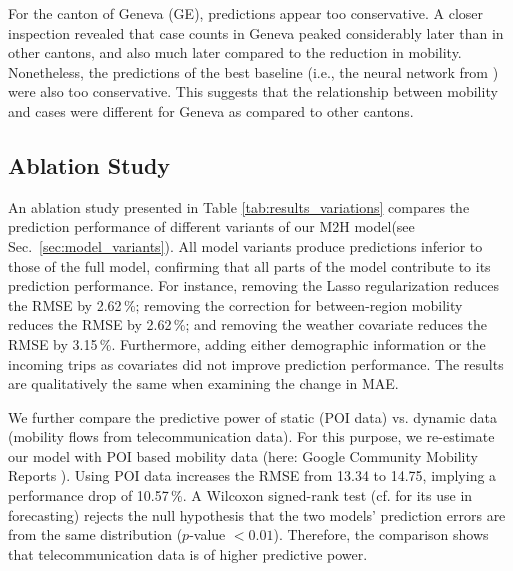 \documentclass[sigconf, review = false, nonacm = true]{acmart}
\newcommand\model{M2H model\xspace}
\begin{document}
For the canton of Geneva (GE), predictions appear too conservative. A closer inspection revealed that case counts in Geneva peaked considerably later than in other cantons, and also much later compared to the reduction in mobility. Nonetheless, the predictions of the best baseline (i.e., the neural network from \cite{wieczorek_neural_2020}) were also too conservative. This suggests that the relationship between mobility and cases were different for Geneva as compared to other cantons. 


\subsection{Ablation Study}
\label{sec:ablationStudy}

An ablation study presented in Table \ref{tab:results_variations} compares the prediction performance of different variants of our  \model (see Sec.~\ref{sec:model_variants}). All model variants produce predictions inferior to those of the full model, confirming that all parts of the model contribute to its prediction performance. For instance, removing the Lasso regularization reduces the RMSE by 2.62\,\%; removing the correction for between-region mobility reduces the RMSE by 2.62\,\%; and removing the weather covariate reduces the RMSE by 3.15\,\%. Furthermore, adding either demographic information or the incoming trips as covariates did not improve prediction performance. The results are qualitatively the same when examining the change in MAE.  

We further compare the predictive power of static (POI data) vs. dynamic data (mobility flows from telecommunication data). For this purpose, we re-estimate our model with POI based mobility data (here: Google Community Mobility Reports \cite{google_llc_google_2020}). Using POI data increases the RMSE from 13.34 to 14.75, implying a performance drop of 10.57\,\%. A Wilcoxon signed-rank test (cf. \cite{flores_utilization_1989} for its use in forecasting) rejects the null hypothesis that the two models' prediction errors are from the same distribution ($p$-value $< 0.01$). Therefore, the comparison shows that telecommunication data is of higher predictive power.
\end{document}
